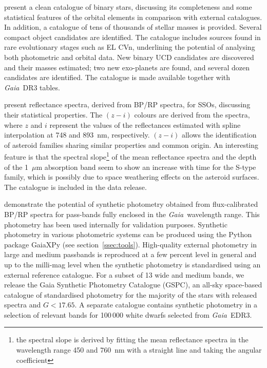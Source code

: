 \documentclass[longauth]{aa}
\providecommand{\bprp}{BP/RP\xspace}
\providecommand\gmag{\ensuremath{G}\xspace}
\newcommand\gaia{\textit{Gaia}\xspace}
\providecommand\gedrthree{\textit{Gaia}~EDR3\xspace}
\providecommand\gdrthree{\textit{Gaia}~DR3\xspace}
\begin{document}
\citet{DR3-DPACP-100} present a clean catalogue of binary stars,  discussing its completeness and some  statistical features of the orbital elements  in comparison with external catalogues.  In addition, a catalogue of tens of thousands of stellar masses is provided. Several compact object candidates are identified.
The catalogue includes sources found  in  rare evolutionary stages such as EL CVn,  underlining the potential of analysing both photometric and orbital data.
 New binary UCD  candidates are discovered and their masses estimated; two new exo-planets are found, and several dozen  candidates are identified.
The catalogue is made available together with \gdrthree tables.

\citet{DR3-DPACP-89} present reflectance spectra, derived from \bprp spectra, for SSOs, discussing their  statistical properties. The $(z-i)$ colours are derived from the spectra, where $z$ and $i$ represent the values of the reflectances estimated with spline interpolation at 748 and 893~nm, respectively. $(z-i)$ allows the identification of asteroid families sharing similar properties and common origin. An interesting feature is that  the spectral slope\footnote{the spectral slope is derived by fitting the mean reflectance spectra in the wavelength range 450 and 760~nm  with a straight line and taking the angular coefficient} of the mean reflectance spectra and the depth of the 1~$\mu$m absorption band seem to show an increase with time for the S-type family, which is possibly due to space weathering effects on the asteroid surfaces. The catalogue is included in the data release.

\citet{DR3-DPACP-93} demonstrate the potential of synthetic photometry obtained  from flux-calibrated \bprp spectra for  pass-bands fully enclosed in the \gaia\ wavelength range. This photometry has been used internally for validation purposes. Synthetic photometry in various photometric systems can be produced using the Python package GaiaXPy (see section~\ref{ssec:tools}).  High-quality external photometry in large and medium passbands is reproduced at a few percent level in general and up to the milli-mag  level when the synthetic photometry is standardised using an external reference catalogue. For a subset of 13 wide and medium bands, we release the  Gaia Synthetic Photometry Catalogue (GSPC), an all-sky space-based catalogue of standardised photometry for the majority of the stars with released spectra and \gmag$<17.65$.  A separate catalogue contains synthetic photometry in a selection of relevant bands for 100\,000 white dwarfs selected from  \gedrthree.  
\end{document}
